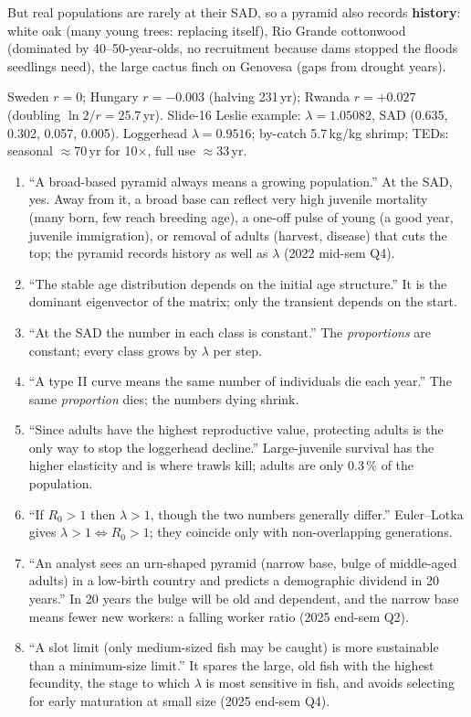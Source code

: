 But real populations are rarely at their SAD, so a pyramid also records \textbf{history}: white oak (many young trees:
replacing itself), Rio Grande cottonwood (dominated by 40--50-year-olds, no recruitment because dams stopped the
floods seedlings need), the large cactus finch on Genovesa (gaps from drought years).

\begin{numbers}
Sweden $r=0$; Hungary $r=-0.003$ (halving 231\,yr); Rwanda $r=+0.027$ (doubling $\ln2/r=25.7$\,yr).
Slide-16 Leslie example: $\lambda=1.05082$, SAD (0.635, 0.302, 0.057, 0.005). Loggerhead $\lambda=0.9516$;
by-catch 5.7\,kg/kg shrimp; TEDs: seasonal $\approx$70\,yr for 10$\times$, full use $\approx$33\,yr.
\end{numbers}

\begin{statements}
\begin{enumerate}[label=\arabic*.]
\item ``A broad-based pyramid always means a growing population.''
\PT At the SAD, yes. Away from it, a broad base can reflect very high juvenile mortality (many born, few reach
breeding age), a one-off pulse of young (a good year, juvenile immigration), or removal of adults (harvest, disease)
that cuts the top; the pyramid records history as well as $\lambda$ (2022 mid-sem Q4).
\item ``The stable age distribution depends on the initial age structure.''
\F It is the dominant eigenvector of the matrix; only the transient depends on the start.
\item ``At the SAD the number in each class is constant.''
\F The \emph{proportions} are constant; every class grows by $\lambda$ per step.
\item ``A type II curve means the same number of individuals die each year.''
\F The same \emph{proportion} dies; the numbers dying shrink.
\item ``Since adults have the highest reproductive value, protecting adults is the only way to stop the loggerhead decline.''
\F Large-juvenile survival has the higher elasticity and is where trawls kill; adults are only 0.3\,\% of the
population.
\item ``If $R_0>1$ then $\lambda>1$, though the two numbers generally differ.''
\T Euler--Lotka gives $\lambda>1\iff R_0>1$; they coincide only with non-overlapping generations.
\item ``An analyst sees an urn-shaped pyramid (narrow base, bulge of middle-aged adults) in a low-birth country and predicts a demographic dividend in 20 years.''
\F In 20 years the bulge will be old and dependent, and the narrow base means fewer new workers: a falling worker
ratio (2025 end-sem Q2).
\item ``A slot limit (only medium-sized fish may be caught) is more sustainable than a minimum-size limit.''
\T It spares the large, old fish with the highest fecundity, the stage to which $\lambda$ is most sensitive in
fish, and avoids selecting for early maturation at small size (2025 end-sem Q4).
\end{enumerate}
\end{statements}

